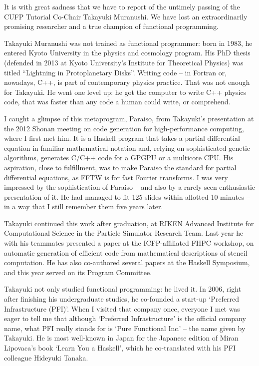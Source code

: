 \label{Takayuki}

\noindent
It is with great sadness that we have to report of the untimely
passing of the CUFP Tutorial Co-Chair Takayuki Muranushi. We have lost
an extraordinarily promising researcher and a true champion of
functional programming.

Takayuki Muranushi was not trained as functional programmer: born in
1983, he entered Kyoto University in the physics and cosmology
program. His PhD thesis (defended in 2013 at Kyoto University's
Institute for Theoretical Physics) was titled ``Lightning in
Protoplanetary Disks''. Writing code -- in Fortran or, nowadays, C++,
is part of contemporary physics practice. That was not enough for Takayuki. He
went one level up: he got the computer to write C++ physics code,
that was faster than any code a human could write, or comprehend.

I caught a glimpse of this metaprogram, Paraiso, from Takayuki's
presentation at the 2012 Shonan meeting on code generation for
high-performance computing, where I first met him. It is a Haskell
program that takes a partial differential equation in familiar
mathematical notation and, relying on sophisticated genetic
algorithms, generates C/C++ code for a GPGPU or a multicore CPU.  His
aspiration, close to fulfillment, was to make Paraiso the standard for
partial differential equations, as FFTW is for fast Fourier transforms.
I was very impressed by the sophistication of Paraiso -- and also by a
rarely seen enthusiastic presentation of it. He had managed to fit 125
slides within allotted 10 minutes -- in a way that I still remember
them five years later.

Takayuki continued this work after graduation, at RIKEN Advanced
Institute for Computational Science in the Particle Simulator Research
Team. Last year he with his teammates presented a paper at the
ICFP-affiliated FHPC workshop, on automatic generation of efficient code from
mathematical descriptions of stencil computation. He has also
co-authored several papers at the Haskell Symposium, and this year served
on its Program Committee.

Takayuki not only studied functional programming: he lived it.  In
2006, right after finishing his undergraduate studies, he co-founded a
start-up `Preferred Infrastructure (PFI)'. When I visited that company
once, everyone I met was eager to tell me that although `Preferred
Infrastructure' is the official company name, what PFI really stands
for is `Pure Functional Inc.' -- the name given by Takayuki. He is
most well-known in Japan for the Japanese edition of Miran Lipovaca's book `Learn You a
Haskell', which he co-translated with his PFI colleague Hideyuki Tanaka.

